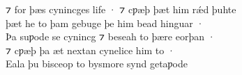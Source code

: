 \documentclass[10pt]{book}
\begin{document}
\begin{center}
{⁊ for þ\ae{}s cynincges life · ⁊ cƿ\ae{}þ þ\ae{}t him rǽd þuhte \\
þ\ae{}t he to þam gebuge þe him bead hinguar · \\
Þa suƿode se cynincg ⁊ beseah to þ\ae{}re eorþan · \\
⁊ cƿ\ae{}þ þa \ae{}t nextan cynelice him to · \\
Eala þu bisceop to bysmore synd getaƿode \\
}
\end{center}

\clearpage


\settowidth{}
\end{document}

